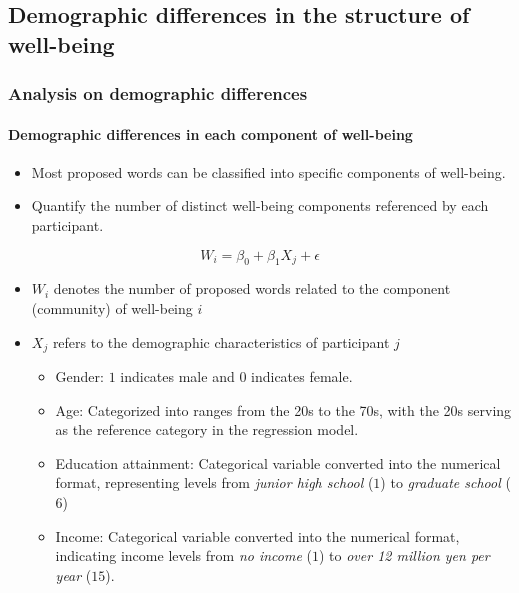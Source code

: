 \documentclass[
	aspectratio=169, %
	t, %
	onlytextwidth, %
	10pt, %
]{beamer}
\begin{document}

\subsection{Demographic differences in the structure of well-being}

\begin{frame}
    \frametitle{Analysis on demographic differences}
    \framesubtitle{Demographic differences in each component of well-being}
    \begin{itemize}
        \item Most proposed words can be classified into specific components of well-being.
        \item Quantify the number of distinct well-being components referenced by each participant.
    \end{itemize}
    \pause
    
    $$
        W_i = \beta_{0}+\beta_{1}X_{j}+\epsilon
    $$
    \vspace{-1.5\baselineskip}
    \begin{itemize}
        \item  $W_i$ denotes the number of proposed words related to the component (community) of well-being $i$
        \item $X_{j}$ refers to the demographic characteristics of participant $j$
        \begin{itemize}
            \item Gender: $1$ indicates male and $0$ indicates female.
            \item Age: Categorized into ranges from the 20s to the 70s, with the 20s serving as the reference category in the regression model. 
            \item Education attainment: Categorical variable converted into the numerical format, representing levels from \textit{junior high school} ($1$) to \textit{graduate school} ($6$)
            \item Income: Categorical variable converted into the numerical format, indicating income levels from \textit{no income} ($1$) to \textit{over 12 million yen per year} ($15$).
        \end{itemize}
    \end{itemize}
    
\end{frame}
\end{document}
